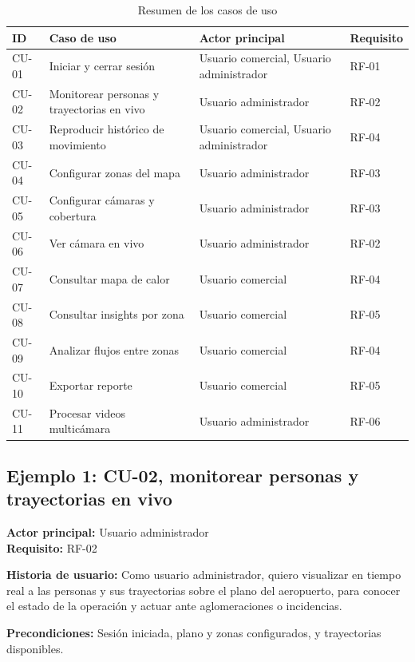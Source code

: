 \documentclass[12pt,a4paper]{article}
\begin{document}
\begin{table}[!htbp]
\centering
\caption{Resumen de los casos de uso}
\label{tab:casos-uso}
\footnotesize
\renewcommand{\arraystretch}{1.15}
\begin{tabular}{|L{0.08\textwidth}|L{0.40\textwidth}|L{0.28\textwidth}|L{0.12\textwidth}|}
\hline
\textbf{ID} & \textbf{Caso de uso} & \textbf{Actor principal} & \textbf{Requisito} \\
\hline
CU-01 & Iniciar y cerrar sesión & Usuario comercial, Usuario administrador & RF-01 \\
\hline
CU-02 & Monitorear personas y trayectorias en vivo & Usuario administrador & RF-02 \\
\hline
CU-03 & Reproducir histórico de movimiento & Usuario comercial, Usuario administrador & RF-04 \\
\hline
CU-04 & Configurar zonas del mapa & Usuario administrador & RF-03 \\
\hline
CU-05 & Configurar cámaras y cobertura & Usuario administrador & RF-03 \\
\hline
CU-06 & Ver cámara en vivo & Usuario administrador & RF-02 \\
\hline
CU-07 & Consultar mapa de calor & Usuario comercial & RF-04 \\
\hline
CU-08 & Consultar insights por zona & Usuario comercial & RF-05 \\
\hline
CU-09 & Analizar flujos entre zonas & Usuario comercial & RF-04 \\
\hline
CU-10 & Exportar reporte & Usuario comercial & RF-05 \\
\hline
CU-11 & Procesar videos multicámara & Usuario administrador & RF-06 \\
\hline
\end{tabular}
\end{table}

\subsection{Ejemplo 1: CU-02, monitorear personas y trayectorias en vivo}
\textbf{Actor principal:} Usuario administrador \\
\textbf{Requisito:} RF-02

\textbf{Historia de usuario:} Como usuario administrador, quiero visualizar en tiempo real a las personas y sus trayectorias sobre el plano del aeropuerto, para conocer el estado de la operación y actuar ante aglomeraciones o incidencias.

\textbf{Precondiciones:} Sesión iniciada, plano y zonas configurados, y
trayectorias disponibles.
\end{document}
